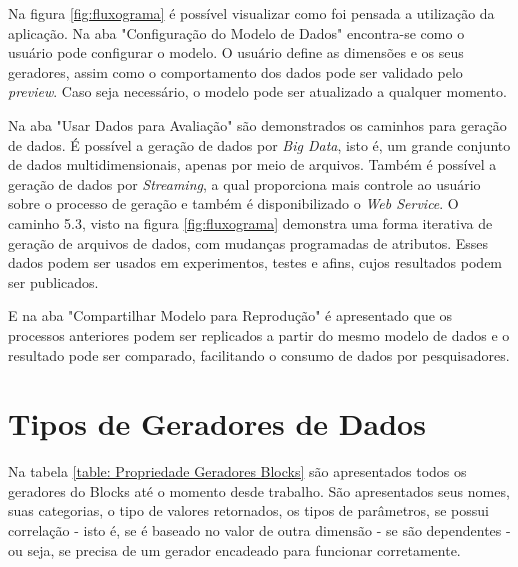 \documentclass[
	12pt,				%
	openright,			%
	oneside,			%
	a4paper,			%
	english,			%
	brazil				%
	]{abntex2}
\begin{document}
	\par
	Na figura \ref{fig:fluxograma} é possível visualizar como foi pensada a utilização da aplicação.
	Na aba "Configuração do Modelo de Dados" encontra-se como o usuário pode configurar o modelo.
	O usuário define as dimensões e os seus geradores, assim como o comportamento dos dados pode ser validado pelo \emph{preview}. 
	Caso seja necessário, o modelo pode ser atualizado a qualquer momento.
	\par
	Na aba "Usar Dados para Avaliação" são demonstrados os caminhos para geração de dados.
	É possível a geração de dados por \emph{Big Data}, isto é, um grande conjunto de dados multidimensionais, apenas por meio de arquivos.
	Também é possível a geração de dados por \emph{Streaming}, a qual proporciona mais controle ao usuário sobre o processo de geração e também é disponibilizado o \emph{Web Service}.
	O caminho 5.3, visto na figura \ref{fig:fluxograma} demonstra uma forma iterativa de geração de arquivos de dados, com mudanças programadas de atributos.
	Esses dados podem ser usados em experimentos, testes e afins, cujos resultados podem ser publicados.
	\par
	E na aba "Compartilhar Modelo para Reprodução" é apresentado que os processos anteriores podem ser replicados a partir do mesmo modelo de dados e o resultado pode ser comparado, facilitando o consumo de dados por pesquisadores.
	
	\section{Tipos de Geradores de Dados}
		
		Na tabela \ref{table: Propriedade Geradores Blocks} são apresentados todos os geradores do Blocks até o momento desde trabalho.
		São apresentados seus nomes, suas categorias, o tipo de valores retornados, os tipos de parâmetros, se possui correlação - isto é, se é baseado no valor de outra dimensão - se são dependentes - ou seja, se precisa de um gerador encadeado para funcionar corretamente.
		
\end{document}
